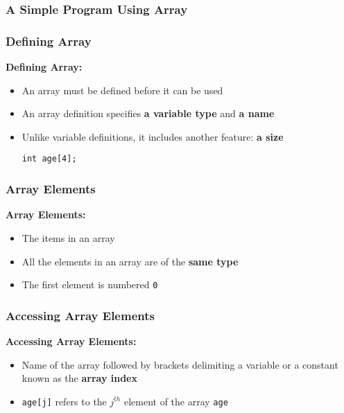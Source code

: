 \documentclass{beamer}
\begin{document}
\begin{frame}[fragile]\frametitle{A Simple Program Using Array}
    \subsubsection{Defining Array} %
    \label{ssub:defining_array}
    \textbf{Defining Array:} \\
    \begin{itemize}
        \item An array must be defined before it can be used
        \item An array definition specifies \textbf{a variable type} and \textbf{a name}
        \item Unlike variable definitions, it includes another feature: \textbf{a size}
        \begin{center}
            \texttt{int age[4];}
        \end{center}
    \end{itemize}

    \subsubsection{Array Elements} %
    \label{ssub:array_elements}
    \textbf{Array Elements:} \\
    \begin{itemize}
        \item The items in an array
        \item All the elements in an array are of the \textbf{same type}
        \item The first element is numbered \texttt{0}
    \end{itemize}

    \subsubsection{Accessing Array Elements} %
    \label{ssub:accessing_array_elements}
    \textbf{Accessing Array Elements:} \\
    \begin{itemize}
         \item Name of the array followed by brackets delimiting a variable or a constant known as the \textbf{array index}
         \item \texttt{age[j]} refers to the $j^{th}$ element of the array \texttt{age}
     \end{itemize}
\end{frame}
\end{document}
